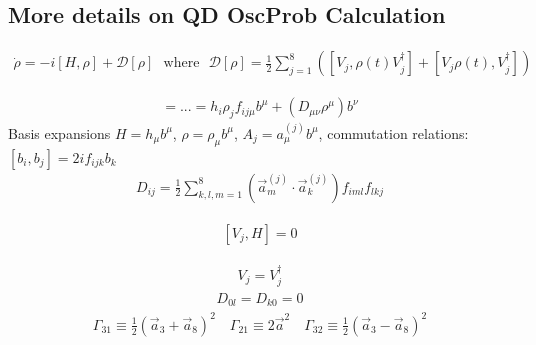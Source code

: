 \subsection{More details on QD OscProb Calculation}
%
\begin{align} \label{eq:deco_operator}
    \dot{\rho} = -i[H,\rho] + \mathcal{D}[\rho] \ \ \ \text{where} \ \ \ \mathcal{D}[\rho] = \frac{1}{2}\sum^8_{j=1}\left( [V_j, \rho(t)V_j^\dagger] + [V_j \rho(t), V_j^\dagger] \right)
\end{align}
%

%
\begin{align} \label{eq:operator_basis_expansion}
    = ... = h_i\rho_j f_{ij\mu} b^\mu + (D_{\mu\nu} \rho^\mu) b^\nu
\end{align}
%
Basis expansions $H = h_\mu b^\mu$, $\rho = \rho_\mu b^\mu$, $A_j = a^{(j)}_\mu b^\mu$, commutation relations: $[b_i,b_j] = 2i f_{ijk}b_k$
%
\begin{align} \label{eq:deco_matrix}
    D_{ij} = \frac{1}{2}\sum^8_{k,l,m=1}\left( \vec{a}^{(j)}_m \cdot \vec{a}^{(j)}_k \right) f_{iml} f_{lkj}
\end{align}
%

%
\begin{align} \label{eq:energy_conservation}
    [V_j, H] = 0
\end{align}
%

%
\begin{align} \label{eq:hermeticity}
    V_j = V_j^\dagger
\end{align}
%
%
\begin{align} \label{eq:unitarity}
    D_{0l} = D_{k0} = 0
\end{align}
%
%
\begin{align} \label{eq:gamma_explicitly}
    \Gamma_{31} \equiv \frac{1}{2} (\vec{a}_3 + \vec{a}_8 )^2 \quad \Gamma_{21} \equiv 2 \vec{a}^2 \quad \Gamma_{32} \equiv \frac{1}{2} (\vec{a}_3 - \vec{a}_8 )^2
\end{align}
%

